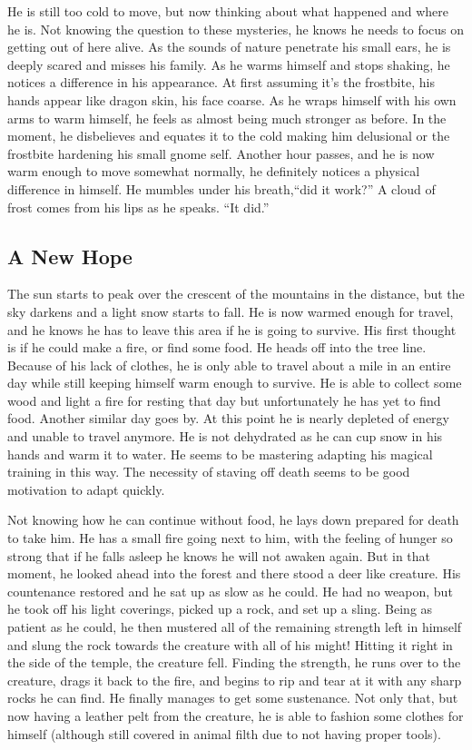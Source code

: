 \documentclass[letterpaper,10pt,twoside,twocolumn,openany]{book}
\begin{document}
He is still too cold to move, but now thinking about what happened and where he is. Not knowing the question to these mysteries, he knows he needs to focus on getting out of here alive. As the sounds of nature penetrate his small ears, he is deeply scared and misses his family. As he warms himself and stops shaking, he notices a difference in his appearance. At first assuming it's the frostbite, his hands appear like dragon skin, his face coarse. As he wraps himself with his own arms to warm himself, he feels as almost being much stronger as before. In the moment, he disbelieves and equates it to the cold making him delusional or the frostbite hardening his small gnome self. Another hour passes, and he is now warm enough to move somewhat normally, he definitely notices a physical difference in himself. He mumbles under his breath,``did it work?'' A cloud of frost comes from his lips as he speaks. ``It did.''

\subsection{A New Hope}

The sun starts to peak over the crescent of the mountains in the distance, but the sky darkens and a light snow starts to fall. He is now warmed enough for travel, and he knows he has to leave this area if he is going to survive. His first thought is if he could make a fire, or find some food. He heads off into the tree line. Because of his lack of clothes, he is only able to travel about a mile in an entire day while still keeping himself warm enough to survive. He is able to collect some wood and light a fire for resting that day but unfortunately he has yet to find food. Another similar day goes by. At this point he is nearly depleted of energy and unable to travel anymore. He is not dehydrated as he can cup snow in his hands and warm it to water. He seems to be mastering adapting his magical training in this way. The necessity of staving off death seems to be good motivation to adapt quickly.

Not knowing how he can continue without food, he lays down prepared for death to take him. He has a small fire going next to him, with the feeling of hunger so strong that if he falls asleep he knows he will not awaken again. But in that moment, he looked ahead into the forest and there stood a deer like creature. His countenance restored and he sat up as slow as he could. He had no weapon, but he took off his light coverings, picked up a rock, and set up a sling. Being as patient as he could, he then mustered all of the remaining strength left in himself and slung the rock towards the creature with all of his might! Hitting it right in the side of the temple, the creature fell. Finding the strength, he runs over to the creature, drags it back to the fire, and begins to rip and tear at it with any sharp rocks he can find. He finally manages to get some sustenance. Not only that, but now having a leather pelt from the creature, he is able to fashion some clothes for himself (although still covered in animal filth due to not having proper tools).
\end{document}
